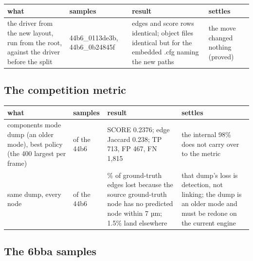 {\footnotesize
\setlength{\tabcolsep}{6pt}
\begin{longtable}{>{\RaggedRight\arraybackslash}p{}>{\RaggedRight\arraybackslash}p{}>{\RaggedRight\arraybackslash}p{}>{\RaggedRight\arraybackslash}p{}}
\toprule
what & samples & result & settles \\
\midrule
\endhead
the driver from the new layout, run from the root, against the driver before the split & 44b6\_\allowbreak{}0113de3b, 44b6\_\allowbreak{}0b24845f & edges and score rows identical; object files identical but for the embedded .cfg naming the new paths & the move changed nothing (proved) \\
\bottomrule
\end{longtable}
}

\subsection{\texorpdfstring{The competition metric}{The competition metric}}

{\footnotesize
\setlength{\tabcolsep}{6pt}
\begin{longtable}{>{\RaggedRight\arraybackslash}p{}>{\RaggedRight\arraybackslash}p{}>{\RaggedRight\arraybackslash}p{}>{\RaggedRight\arraybackslash}p{}}
\toprule
what & samples & result & settles \\
\midrule
\endhead
components mode dump (an older mode), best policy (the 400 largest per frame) & 13 of the 44b6 & SCORE 0.2376; edge Jaccard 0.238; TP 713, FP 467, FN 1,815 & the internal 98\% does not carry over to the metric \\
same dump, every node & 13 of the 44b6 & 60.4\% of ground-truth edges lost because the source ground-truth node has no predicted node within 7 µm; 1.5\% land elsewhere & that dump's loss is detection, not linking; the dump is an older mode and must be redone on the current engine \\
\bottomrule
\end{longtable}
}

\subsection{\texorpdfstring{The 6bba samples}{The 6bba samples}}

